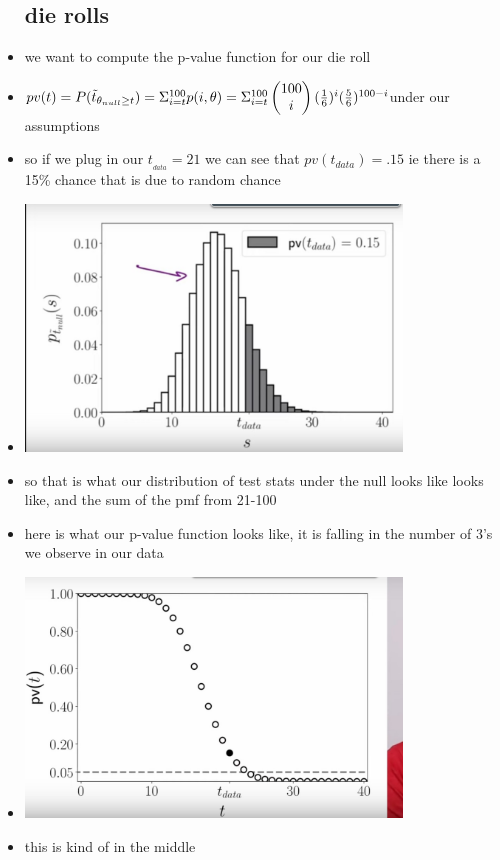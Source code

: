 \documentclass{article}
\begin{document}
\begin{itemize}
\subsection{die rolls }
\item we want to compute the p-value function for our die roll 
\item $pv(t)=P(\Tilde{t}_{\theta_{null}\geq t})= \Sigma_{i=t}^{100}p(i,\theta)=\Sigma_{i=t}^{100}\begin{pmatrix}100\\i\end{pmatrix}(\frac{1}{6})^{i}(\frac{5}{6})^{100-i}$under our assumptions 
\item so if we plug in our $t__{data}=21$ we can see that $pv(t_{data})=.15$ ie there is a 15\% chance that is due to random chance 
\item \includegraphics[width=10cm]{notes/week_6/vidio 1: THE NULL HYPOTHESIS AND THE P VALUE/immages/v1_1.jpg}
\item so that is what our distribution of test stats under the null looks like looks like, and the sum of the pmf from 21-100
\item here is what our p-value function looks like, it is falling in the number of 3's we observe in our data 
\item \includegraphics[width=10cm]{notes/week_6/vidio 1: THE NULL HYPOTHESIS AND THE P VALUE/immages/v1_2.jpg}
\item this is kind of in the middle

\end{itemize}
\end{document}
